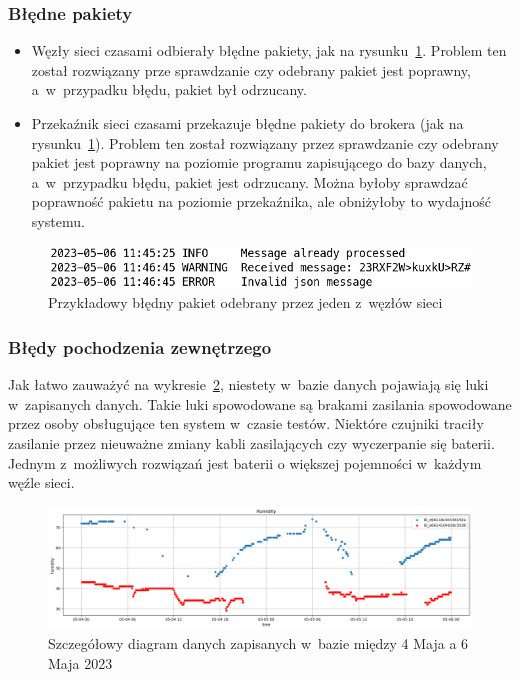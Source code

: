 \subsubsection{Błędne pakiety}
\begin{itemize}
    \item Węzły sieci czasami odbierały błędne pakiety, jak na rysunku~\ref{rys:zly-pakiet}. Problem ten został rozwiązany prze sprawdzanie czy odebrany pakiet jest poprawny, a~w~przypadku błędu, pakiet był odrzucany.
    \item Przekaźnik sieci czasami przekazuje błędne pakiety do brokera (jak na rysunku~\ref{rys:zly-pakiet}). Problem ten został rozwiązany przez sprawdzanie czy odebrany pakiet jest poprawny na poziomie programu zapisującego do bazy danych, a~w~przypadku błędu, pakiet jest odrzucany. Można byłoby sprawdzać poprawność pakietu na poziomie przekaźnika, ale obniżyłoby to wydajność systemu.
\end{itemize}

\begin{figure}[b!]
    \begin{center}
        \includegraphics[width=13cm]{pic/zly-pakiet.png}
    \end{center}
    \caption{Przykładowy błędny pakiet odebrany przez jeden z~węzłów sieci}\label{rys:zly-pakiet}
\end{figure}

\subsubsection{Błędy pochodzenia zewnętrzego}
Jak łatwo zauważyć na wykresie~\ref{rys:diagram-scat}, niestety w~bazie danych pojawiają się luki w~zapisanych danych.
Takie luki spowodowane są brakami zasilania spowodowane przez osoby obsługujące ten system w~czasie testów.
Niektóre czujniki traciły zasilanie przez nieuważne zmiany kabli zasilających czy wyczerpanie się baterii.
Jednym z~możliwych rozwiązań jest baterii o większej pojemności w~każdym węźle sieci.

\begin{figure}[b!]
    \begin{center}
        \includegraphics[width=13cm]{pic/diagram-scat-humm.png}
    \end{center}
    \caption{Szczegółowy diagram danych zapisanych w~bazie między 4 Maja a 6 Maja 2023}\label{rys:diagram-scat}
\end{figure}

